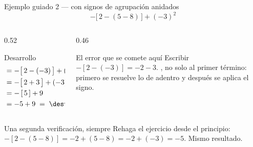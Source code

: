 \documentclass[aspectratio=169,10pt]{beamer}
\begin{document}
\begin{frame}{Ejemplo guiado 2 — con signos de agrupación anidados}
  \scriptsize
  \[ -\big[\,2 - (5-8)\,\big] + (-3)^2 \]

  \vspace{0.1cm}
  \begin{columns}[T,onlytextwidth]
    \begin{column}{0.52\textwidth}
      \begin{block}{Desarrollo}
        \tiny
        \begin{align*}
          &= -\big[\,2 - (-3)\,\big] + (-3)^2 &&\text{paréntesis interno} \\
          &= -\big[\,2 + 3\,\big] + (-3)^2 &&\text{resta del opuesto} \\
          &= -\,[\,5\,] + 9 &&\text{corchete y potencia} \\
          &= -5 + 9 \;=\; \destacar{4}
        \end{align*}
      \end{block}
    \end{column}
    \begin{column}{0.46\textwidth}
      \begin{alertblock}{El error que se comete aquí}
        \tiny
        Escribir $-[2 - (-3)] = -2 - 3$. , no solo al primer término: primero se resuelve lo de
        adentro y después se aplica el signo.
      \end{alertblock}
    \end{column}
  \end{columns}

  \vspace{0.1cm}
  \begin{exampleblock}{Una segunda verificación, siempre}
    \scriptsize
    Rehaga el ejercicio  desde el principio:
    $-[2-(5-8)] = -2 + (5-8) = -2 + (-3) = -5$. Mismo resultado.
  \end{exampleblock}
\end{frame}
\end{document}

